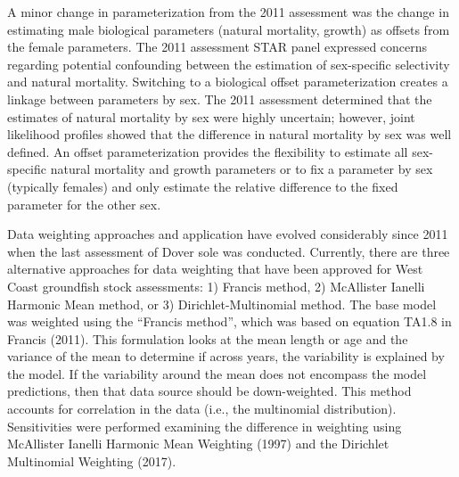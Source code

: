 \documentclass[11pt,
  english,
  a4paper,
]{article}
\begin{document}
A minor change in parameterization from the 2011 assessment was the change in estimating male biological parameters (natural mortality, growth) as offsets from the female parameters. The 2011 assessment STAR panel expressed concerns regarding potential confounding between the estimation of sex-specific selectivity and natural mortality. Switching to a biological offset parameterization creates a linkage between parameters by sex. The 2011 assessment determined that the estimates of natural mortality by sex were highly uncertain; however, joint likelihood profiles showed that the difference in natural mortality by sex was well defined. An offset parameterization provides the flexibility to estimate all sex-specific natural mortality and growth parameters or to fix a parameter by sex (typically females) and only estimate the relative difference to the fixed parameter for the other sex.

\leavevmode\tagmcend\tagstructend\par


Data weighting approaches and application have evolved considerably since 2011 when the last assessment of Dover sole was conducted. Currently, there are three alternative approaches for data weighting that have been approved for West Coast groundfish stock assessments: 1) Francis method, 2) McAllister Ianelli Harmonic Mean method, or 3) Dirichlet-Multinomial method. The base model was weighted using the ``Francis method'', which was based on equation TA1.8 in Francis {(2011)\leavevmode\tagmcend\tagstructend}. This formulation looks at the mean length or age and the variance of the mean to determine if across years, the variability is explained by the model. If the variability around the mean does not encompass the model predictions, then that data source should be down-weighted. This method accounts for correlation in the data (i.e., the multinomial distribution). Sensitivities were performed examining the difference in weighting using McAllister Ianelli Harmonic Mean Weighting {(1997)\leavevmode\tagmcend\tagstructend} and the Dirichlet Multinomial Weighting {(2017)\leavevmode\tagmcend\tagstructend}.

\leavevmode\tagmcend\tagstructend\par

\end{document}
